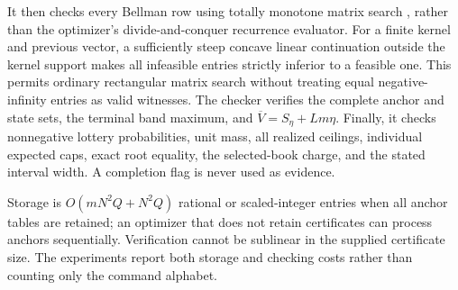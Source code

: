 It then checks every Bellman row using totally monotone matrix search \citep{Aggarwal1987}, rather than the optimizer's divide-and-conquer recurrence evaluator. For a finite kernel and previous vector, a sufficiently steep concave linear continuation outside the kernel support makes all infeasible entries strictly inferior to a feasible one. This permits ordinary rectangular matrix search without treating equal negative-infinity entries as valid witnesses. The checker verifies the complete anchor and state sets, the terminal band maximum, and $\overline V=S_\eta+Lm\eta$. Finally, it checks nonnegative lottery probabilities, unit mass, all realized ceilings, individual expected caps, exact root equality, the selected-book charge, and the stated interval width. A completion flag is never used as evidence.

Storage is $O(mN^2Q+N^2Q)$ rational or scaled-integer entries when all anchor tables are retained; an optimizer that does not retain certificates can process anchors sequentially. Verification cannot be sublinear in the supplied certificate size. The experiments report both storage and checking costs rather than counting only the command alphabet.

